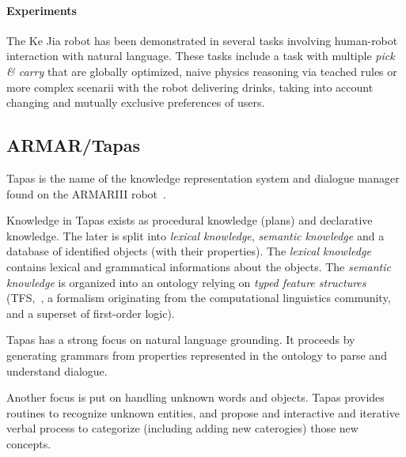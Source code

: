 \documentclass[a4paper, twocolumn]{article}
\begin{document}
\paragraph{Experiments} The Ke Jia robot has been demonstrated in several tasks
involving human-robot interaction with natural language. These tasks include a
task with multiple \emph{pick \& carry} that are globally optimized, naive
physics reasoning via teached rules or more complex scenarii with the robot
delivering drinks, taking into account changing and mutually exclusive
preferences of users.

\subsection{ARMAR/Tapas}

{\sc Tapas} is the name of the knowledge representation system and dialogue
manager found on the ARMARIII robot~\cite{Holzapfel2008}.

Knowledge in {\sc Tapas} exists as procedural knowledge (plans) and declarative
knowledge. The later is split into \emph{lexical knowledge}, \emph{semantic
knowledge} and a database of identified objects (with their properties). The
\emph{lexical knowledge} contains lexical and grammatical informations about
the objects. The \emph{semantic knowledge} is organized into an ontology
relying on \emph{typed feature structures} (TFS,~\cite{Carpenter1992}, a
formalism originating from the computational linguistics community, and a
superset of first-order logic).

{\sc Tapas} has a strong focus on natural language grounding. It proceeds by
generating grammars from properties represented in the ontology to parse and
understand dialogue.

Another focus is put on handling unknown words and objects. {\sc Tapas}
provides routines to recognize unknown entities, and propose and interactive
and iterative verbal process to categorize (including adding new caterogies)
those new concepts.
\end{document}

